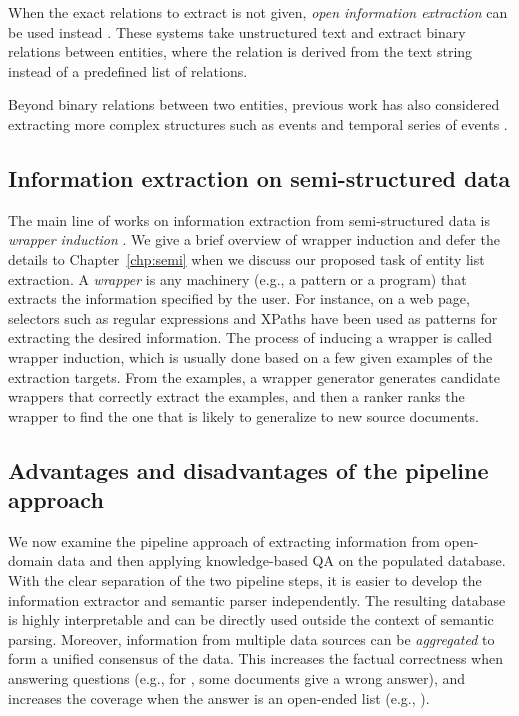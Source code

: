 When the exact relations to extract is not given,
\emph{open information extraction} can be used instead
\cite{banko2007open,fader11reverb,etzioni11openie,masaum2012open,mitchell2015nell}.
These systems take unstructured text and extract
binary relations between entities,
where the relation is derived from the text string
instead of a predefined list of relations.

Beyond binary relations between two entities,
previous work has also considered extracting more complex structures
such as events and temporal series of events
\cite{riedel2011robust,li2013joint,chen2015event}.

\subsection{Information extraction on semi-structured data}

The main line of works on information extraction from semi-structured data
is \emph{wrapper induction}
\cite{kushmerick1997wrapper,crescenzi2001roadrunner,dalvi2011automatic}.
We give a brief overview of wrapper induction
and defer the details to Chapter~\ref{chp:semi}
when we discuss our proposed task of entity list extraction.
A \emph{wrapper} is
any machinery (e.g., a pattern or a program)
that extracts the information specified by the user.
For instance, on a web page,
selectors such as regular expressions and 
XPaths have been used as patterns for extracting the desired information.
The process of inducing a wrapper is called wrapper induction,
which is usually done based on a few given examples 
of the extraction targets.
From the examples,
a wrapper generator generates candidate wrappers that correctly extract
the examples,
and then a ranker ranks the wrapper to find the one that is likely
to generalize to new source documents.

\subsection{Advantages and disadvantages of the pipeline approach}

We now examine the pipeline approach of
extracting information from open-domain data and then
applying knowledge-based QA on the populated database.
With the clear separation of the two pipeline steps,
it is easier to develop the information extractor and
semantic parser independently.
The resulting database is highly interpretable
and can be directly used outside the context of semantic parsing.
Moreover, information from multiple data sources
can be \emph{aggregated} to form a unified consensus of the data.
This increases the factual correctness when answering questions
(e.g., for ,
some documents give a wrong answer),
and increases the coverage when the answer is an open-ended list
(e.g., ).

